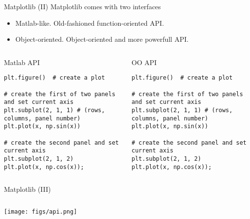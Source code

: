\documentclass[10pt,compress]{beamer} %
\begin{document}
\begin{frame}[fragile]{Matplotlib (II)}
	Matplotlib comes with two interfaces
	\begin{itemize}
		\item Matlab-like. Old-fashioned function-oriented API.
		\item Object-oriented. Object-oriented and more powerfull API.
	\end{itemize}

	\begin{columns}
	\begin{exampleblock}{Matlab API}
	\vspace{-0.2cm} 
\begin{lstlisting}
plt.figure()  # create a plot

# create the first of two panels and set current axis
plt.subplot(2, 1, 1) # (rows, columns, panel number)
plt.plot(x, np.sin(x))

# create the second panel and set current axis
plt.subplot(2, 1, 2)
plt.plot(x, np.cos(x));
\end{lstlisting}
	\vspace{-0.2cm} 
	\end{exampleblock}

	\begin{exampleblock}{OO API}
	\vspace{-0.2cm} 
\begin{lstlisting}
plt.figure()  # create a plot

# create the first of two panels and set current axis
plt.subplot(2, 1, 1) # (rows, columns, panel number)
plt.plot(x, np.sin(x))

# create the second panel and set current axis
plt.subplot(2, 1, 2)
plt.plot(x, np.cos(x));
\end{lstlisting}
	\vspace{-0.2cm} 
	\end{exampleblock}
	\end{columns}
\end{frame}

\begin{frame}[fragile]{Matplotlib (III)}
	\begin{columns}
		\texttt{[image: figs/api.png]}
	\end{columns}
\end{frame}
\end{document}
